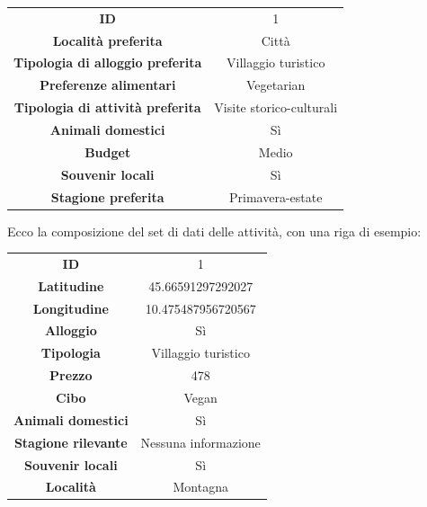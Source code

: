 \documentclass{CSUniSchoolLabReport}
\begin{document}
\begin{center}
\begin{tabular}{|c|c|} \hline\rowcolor{lightgreen}
\textbf{ID}                              & 1                        \\\rowcolor{green}
\textbf{Località preferita}              & Città                    \\\rowcolor{lightgreen}
\textbf{Tipologia di alloggio preferita} & Villaggio turistico      \\\rowcolor{green}
\textbf{Preferenze alimentari}           & Vegetarian               \\\rowcolor{lightgreen}
\textbf{Tipologia di attività preferita} & Visite storico-culturali \\\rowcolor{green}
\textbf{Animali domestici}               & Sì                       \\\rowcolor{lightgreen}
\textbf{Budget}                          & Medio                    \\\rowcolor{green}
\textbf{Souvenir locali}                 & Sì                       \\\rowcolor{lightgreen}
\textbf{Stagione preferita}              & Primavera-estate         \\\hline
\end{tabular}
\end{center}

Ecco la composizione del set di dati delle attività, con una riga di esempio: \\

\begin{center}
\begin{tabular}{|c|c|} \hline\rowcolor{lightgreen}
\textbf{ID}                 & 1                    \\\rowcolor{green}
\textbf{Latitudine}         & 45.66591297292027    \\\rowcolor{lightgreen}
\textbf{Longitudine}        & 10.475487956720567   \\\rowcolor{green}
\textbf{Alloggio}           & Sì                   \\\rowcolor{lightgreen}
\textbf{Tipologia}          & Villaggio turistico  \\\rowcolor{green}
\textbf{Prezzo}             & 478                  \\\rowcolor{lightgreen}
\textbf{Cibo}               & Vegan                \\\rowcolor{green}
\textbf{Animali domestici}  & Sì                   \\\rowcolor{lightgreen}
\textbf{Stagione rilevante} & Nessuna informazione \\\rowcolor{green}
\textbf{Souvenir locali}    & Sì                   \\\rowcolor{lightgreen}
\textbf{Località}           & Montagna			   \\\hline
\end{tabular}
\end{center}
\end{document}
